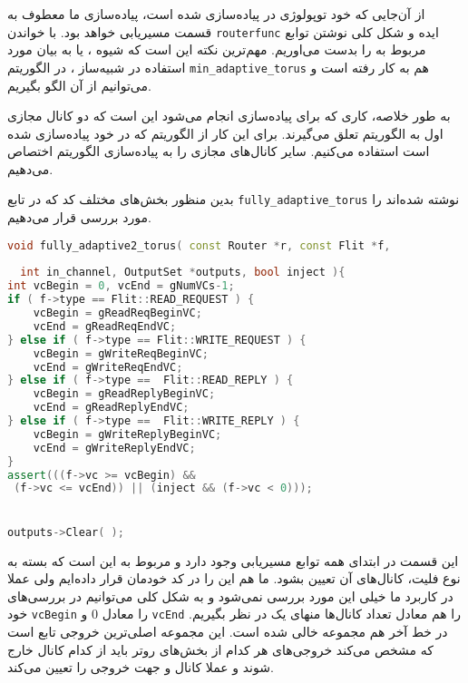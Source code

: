 


از آن‌جایی که خود توپولوژی  در  پیاده‌سازی شده است، پیاده‌سازی ما معطوف به قسمت مسیریابی خواهد بود. با خواندن \verb*|routerfunc| ایده و شکل کلی نوشتن توابع مربوط به  را بدست می‌اوریم. مهم‌ترین نکته این است که شیوه ، یا به بیان مورد استفاده در شبیه‌ساز ، در الگوریتم \verb*|min_adaptive_torus| هم به کار رفته است و می‌توانیم از آن الگو بگیریم.


به طور خلاصه، کاری که برای پیاده‌سازی  انجام می‌شود این است که دو کانال مجازی اول به الگوریتم
  تعلق می‌گیرند. برای این کار از الگوریتم 
   که در خود  پیاده‌سازی شده است استفاده می‌کنیم. سایر کانال‌های مجازی را به پیاده‌سازی الگوریتم  اختصاص می‌دهیم.

بدین منظور بخش‌های مختلف کد که در تابع \verb*|fully_adaptive_torus| نوشته شده‌اند را مورد بررسی قرار می‌دهیم.

\begin{latin}
	\begin{lstlisting}[language = c++]
  void fully_adaptive2_torus( const Router *r, const Flit *f, 
  
  int in_channel, OutputSet *outputs, bool inject ){
int vcBegin = 0, vcEnd = gNumVCs-1;
if ( f->type == Flit::READ_REQUEST ) {
	vcBegin = gReadReqBeginVC;
	vcEnd = gReadReqEndVC;
} else if ( f->type == Flit::WRITE_REQUEST ) {
	vcBegin = gWriteReqBeginVC;
	vcEnd = gWriteReqEndVC;
} else if ( f->type ==  Flit::READ_REPLY ) {
	vcBegin = gReadReplyBeginVC;
	vcEnd = gReadReplyEndVC;
} else if ( f->type ==  Flit::WRITE_REPLY ) {
	vcBegin = gWriteReplyBeginVC;
	vcEnd = gWriteReplyEndVC;
}
assert(((f->vc >= vcBegin) &&
 (f->vc <= vcEnd)) || (inject && (f->vc < 0)));


outputs->Clear( );
	\end{lstlisting}
\end{latin}

این قسمت در ابتدای همه توابع مسیریابی وجود دارد و مربوط به این است که بسته به نوع فلیت، کانال‌های آن تعیین بشود. ما هم این را در کد خودمان قرار داده‌ایم ولی عملا در کاربرد ما خیلی این مورد بررسی نمی‌شود و به شکل کلی می‌توانیم در بررسی‌های خود \verb*|vcBegin| را معادل $0$ و \verb*|vcEnd| را هم معادل تعداد کانال‌ها منهای یک در نظر بگیریم. در خط آخر هم مجموعه  خالی شده است. این مجموعه اصلی‌ترین خروجی تابع است که مشخص می‌کند خروجی‌های هر کدام از بخش‌های روتر باید از کدام کانال خارج شوند و عملا کانال و جهت خروجی را تعیین می‌کند.



